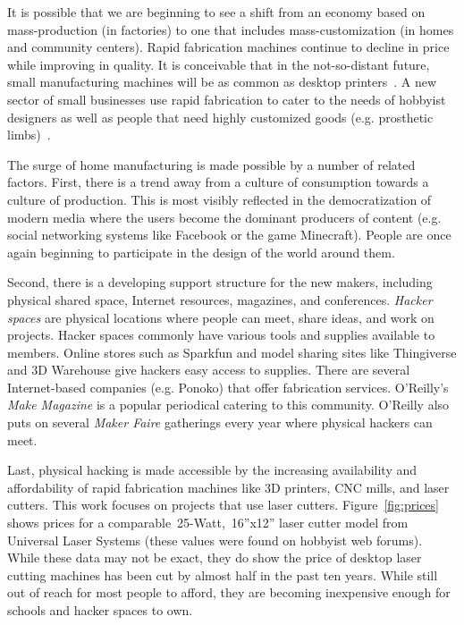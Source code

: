 \documentclass[11pt]{article}
\begin{document}
It is possible that we are beginning to see a shift from an economy
based on mass-production (in factories) to one that includes
mass-customization (in homes and community centers). Rapid fabrication
machines continue to decline in price while improving in quality. It
is conceivable that in the not-so-distant future, small manufacturing
machines will be as common as desktop printers~\cite{economist-fab}. A
new sector of small businesses use rapid fabrication to cater to the
needs of hobbyist designers as well as people that need highly
customized goods (e.g. prosthetic limbs)~\cite{nyt-rapidfab}.

The surge of home manufacturing is made possible by a number of
related factors. First, there is a trend away from a culture of
consumption towards a culture of production. This is most visibly
reflected in the democratization of modern media where the users
become the dominant producers of content (e.g. social networking
systems like Facebook or the game Minecraft). People are once again
beginning to participate in the design of the world around them.

Second, there is a developing support structure for the new makers,
including physical shared space, Internet resources, magazines, and
conferences. \textit{Hacker spaces} are physical locations where
people can meet, share ideas, and work on projects. Hacker spaces
commonly have various tools and supplies available to members. Online
stores such as Sparkfun and model sharing sites like Thingiverse and
3D Warehouse give hackers easy access to supplies. There are several
Internet-based companies (e.g. Ponoko) that offer fabrication
services. O'Reilly's \textit{Make Magazine} is a popular periodical
catering to this community. O'Reilly also puts on several
\textit{Maker Faire} gatherings every year where physical hackers can
meet.

Last, physical hacking is made accessible by the increasing
availability and affordability of rapid fabrication machines like 3D
printers, CNC mills, and laser cutters. This work focuses on projects
that use laser cutters. Figure~\ref{fig:prices} shows prices for a
comparable~25-Watt,~16''x12'' laser cutter model from Universal Laser
Systems (these values were found on hobbyist web forums). While these
data may not be exact, they do show the price of desktop laser cutting
machines has been cut by almost half in the past ten years. While
still out of reach for most people to afford, they are becoming
inexpensive enough for schools and hacker spaces to own.
\end{document}
